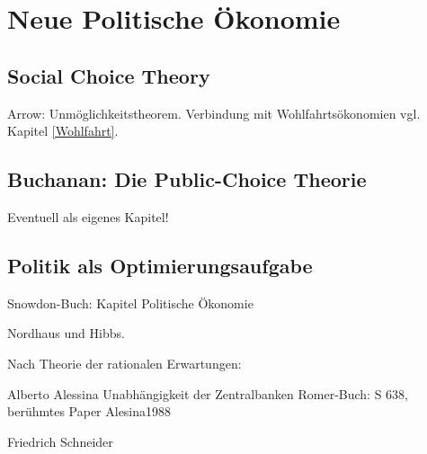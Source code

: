 %
%
%

\chapter{Neue Politische Ökonomie}
\label{Neue_Politik}

\section{Social Choice Theory}

Arrow: Unmöglichkeitstheorem.
Verbindung mit Wohlfahrtsökonomien vgl. Kapitel \ref{Wohlfahrt}.


\section{Buchanan: Die Public-Choice Theorie}
\label{Pol_Econ}

Eventuell als eigenes Kapitel!


\section{Politik als Optimierungsaufgabe}
Snowdon-Buch: Kapitel Politische Ökonomie

Nordhaus und Hibbs.

Nach Theorie der rationalen Erwartungen:

Alberto Alessina
Unabhängigkeit der Zentralbanken Romer-Buch: S 638, berühmtes Paper Alesina1988

Friedrich Schneider